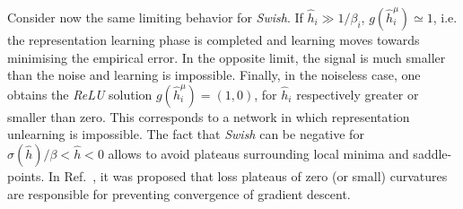 \documentclass{article}
\begin{document}
Consider now the same limiting behavior for {\it Swish}. If $\hat{h}_i \gg 1/\beta_i$, $g(\hat{h}^{\mu}_i)\simeq 1$, i.e. the representation learning phase is completed and learning moves towards minimising the empirical error. In the opposite limit, the signal is much smaller than the noise and learning is impossible. Finally, in the noiseless case, one obtains the {\it ReLU} solution $g(\hat{h}^{\mu}_i) = (1, 0) $, for $\hat{h}_i $ respectively greater or smaller than zero. This corresponds to a network in which representation unlearning is impossible. The fact that {\it Swish} can be negative for $\sigma(\hat{h})/\beta <\hat{h}<0$ allows to avoid plateaus surrounding local minima and saddle-points. In Ref.~\cite{dauphin}, it was proposed that loss plateaus of zero (or small) curvatures are responsible for preventing convergence of gradient descent.
\end{document}
